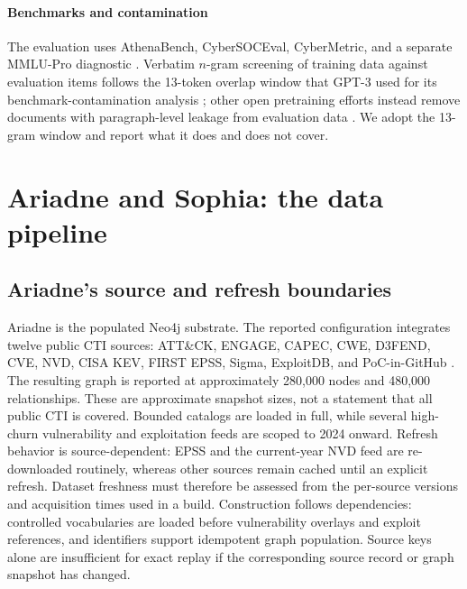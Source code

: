 \documentclass[preprint,12pt,authoryear]{elsarticle}
\begin{document}
\paragraph{Benchmarks and contamination}
The evaluation uses AthenaBench, CyberSOCEval, CyberMetric, and a separate MMLU-Pro diagnostic \citep{alam2025athenabench,deason2025cybersoceval,tihanyi2024cybermetric,wang2024mmlupro}. Verbatim $n$-gram screening of training data against evaluation items follows the 13-token overlap window that GPT-3 used for its benchmark-contamination analysis \citep{brown2020gpt3}; other open pretraining efforts instead remove documents with paragraph-level leakage from evaluation data \citep{groeneveld2024olmo}. We adopt the 13-gram window and report what it does and does not cover.

\section{Ariadne and Sophia: the data pipeline}\label{sec:data}
\subsection{Ariadne's source and refresh boundaries}
Ariadne is the populated Neo4j substrate. The reported configuration integrates twelve public CTI sources: ATT\&CK, ENGAGE, CAPEC, CWE, D3FEND, CVE, NVD, CISA KEV, FIRST EPSS, Sigma, ExploitDB, and PoC-in-GitHub \citep{strom2018mitre,mitreCWE,mitreCAPEC,mitreCVE}. The resulting graph is reported at approximately 280,000 nodes and 480,000 relationships. These are approximate snapshot sizes, not a statement that all public CTI is covered. Bounded catalogs are loaded in full, while several high-churn vulnerability and exploitation feeds are scoped to 2024 onward. Refresh behavior is source-dependent: EPSS and the current-year NVD feed are re-downloaded routinely, whereas other sources remain cached until an explicit refresh. Dataset freshness must therefore be assessed from the per-source versions and acquisition times used in a build. Construction follows dependencies: controlled vocabularies are loaded before vulnerability overlays and exploit references, and identifiers support idempotent graph population. Source keys alone are insufficient for exact replay if the corresponding source record or graph snapshot has changed.
\end{document}
